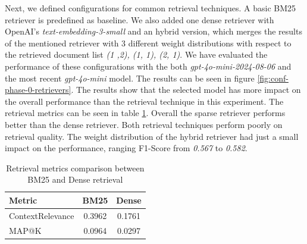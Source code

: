 Next, we defined configurations for common retrieval techniques. A basic BM25 retriever is predefined as baseline. We also added one dense retriever with OpenAI's \textit{text-embedding-3-small}\cite{OpenAI_2022} and an hybrid version, which merges the results of the mentioned retriever with 3 different weight distributions with respect to the retrieved document list \textit{(1 ,2), (1, 1), (2, 1)}. We have evaluated the performance of these configurations with the both \textit{gpt-4o-mini-2024-08-06} and the most recent \textit{gpt-4o-mini} model. The results can be seen in figure \ref{fig:conf-phase-0-retrievers}. The results show that the selected model has more impact on the overall performance than the retrieval technique in this experiment. The retrieval metrics can be seen in table \ref{tab:retrieval_metrics}. Overall the sparse retriever performs better than the dense retriever. Both retrieval techniques perform poorly on retrieval quality. The weight distribution of the hybrid retriever had just a small impact on the performance, ranging F1-Score from \textit{0.567} to \textit{0.582}.

\begin{table}[h]
    \centering
    \begin{tabular}{|l|c|c|}
        \hline
        \textbf{Metric} & \textbf{BM25} & \textbf{Dense} \\
        \hline
        ContextRelevance & 0.3962 & 0.1761 \\
        MAP@K & 0.0964 & 0.0297 \\
        \hline
    \end{tabular}
    \caption{Retrieval metrics comparison between BM25 and Dense retrieval}
    \label{tab:retrieval_metrics}
\end{table}

